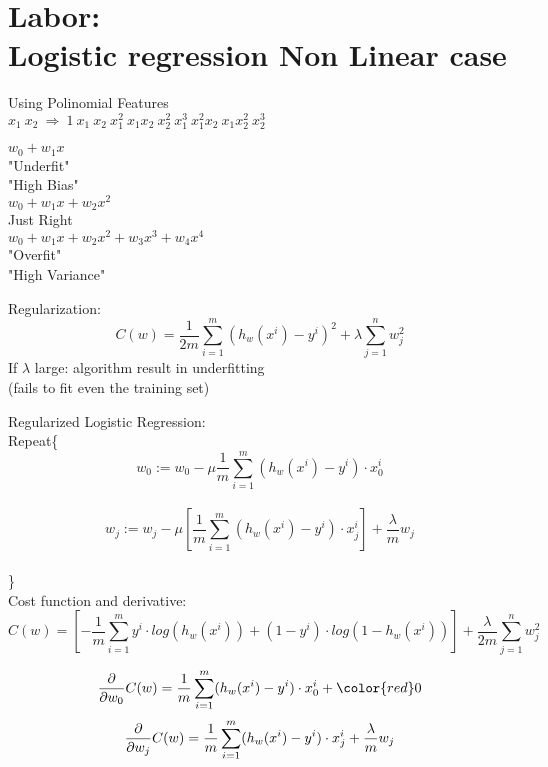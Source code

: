 \documentclass[12pt]{article}
\newcommand\tab[1][1cm]{\hspace*{#1}}
\begin{document}
\section{Labor:\\ \large Logistic regression Non Linear case}
Using Polinomial Features\\
$x_1\ x_2\ \Rightarrow\ 1\ x_1\ x_2\ x_1^2\ x_1x_2\ x_2^2\ x_1^3\ x_1^2x_2\ x_1x_2^2\ x_2^3$\\
\begin{center}
$w_0+w_1x$\\
"Underfit"\\
"High Bias"\\
\vspace{10mm}
$w_0+w_1x+w_2x^2$\\
Just Right\\
\vspace{10mm}
$w_0+w_1x+w_2x^2+w_3x^3+w_4x^4$\\
"Overfit"\\
"High Variance"
\end{center}

Regularization:
\begin{equation}
C(w)=\frac{1}{2m}\sum_{i=1}^m(h_w(x^i)-y^i)^2+\lambda\sum_{j=1}^nw_j^2
\end{equation}
If $\lambda$ large: algorithm result in underfitting\\ 
(fails to fit even the training set)

Regularized Logistic Regression:\\
Repeat\{\\
\tab $$w_0:=w_0-\mu\frac{1}{m}\sum_{i=1}^{m}(h_w(x^i)-y^i)\cdot x_0^i$$\\
\tab $$w_j:=w_j-\mu[ \frac{1}{m}\sum_{i=1}^{m}(h_w(x^i)-y^i)\cdot x_j^i]+\frac{\lambda}{m}w_j$$\\
\}
\\

Cost function and derivative:
\begin{equation}
C(w)=[-\frac{1}{m}\sum_{i=1}^{m}y^i\cdot log(h_w(x^i))+(1-y^i)\cdot log(1-h_w(x^i))]+\frac{\lambda}{2m}\sum_{j=1}^nw_j^2
\end{equation}

\begin{equation}
\frac{\partial}{\partial w_0}C(w)=\frac{1}{m}\sum_{i=1}^{m}(h_w(x^i)-y^i)\cdot x_0^i+{\color{red} 0}
\end{equation}
\begin{equation}
\frac{\partial}{\partial w_j}C(w)=\frac{1}{m}\sum_{i=1}^{m}(h_w(x^i)-y^i)\cdot x_j^i+\frac{\lambda}{m}w_j\\
\end{equation}
\newpage
\end{document}
